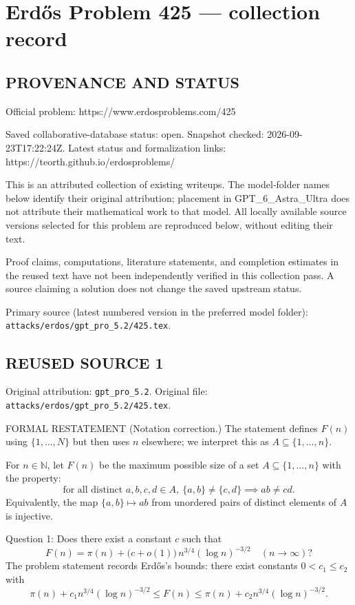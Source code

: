 \section*{Erd\H{o}s Problem 425 --- collection record}

\subsection*{PROVENANCE AND STATUS}
Official problem: https://www.erdosproblems.com/425

Saved collaborative-database status: open.
Snapshot checked: 2026-09-23T17:22:24Z.
Latest status and formalization links: https://teorth.github.io/erdosproblems/

This is an attributed collection of existing writeups. The model-folder names below identify their original attribution; placement in GPT\_6\_Astra\_Ultra does not attribute their mathematical work to that model. All locally available source versions selected for this problem are reproduced below, without editing their text.

Proof claims, computations, literature statements, and completion estimates in the reused text have not been independently verified in this collection pass. A source claiming a solution does not change the saved upstream status.

Primary source (latest numbered version in the preferred model folder): \texttt{attacks/erdos/gpt\_pro\_5.2/425.tex}.

\subsection*{REUSED SOURCE 1}
Original attribution: \texttt{gpt\_pro\_5.2}.
Original file: \texttt{attacks/erdos/gpt\_pro\_5.2/425.tex}.


FORMAL RESTATEMENT
(Notation correction.) The statement defines $F(n)$ using $\{1,\dots,N\}$ but then uses $n$ elsewhere; we interpret this as $A\subseteq\{1,\dots,n\}$.

For $n\in\mathbb N$, let $F(n)$ be the maximum possible size of a set $A\subseteq\{1,\dots,n\}$ with the property:
\[
\text{for all distinct }a,b,c,d\in A,\ \{a,b\}\ne\{c,d\}\implies ab\ne cd.
\]
Equivalently, the map $\{a,b\}\mapsto ab$ from unordered pairs of distinct elements of $A$ is injective.

Question 1: Does there exist a constant $c$ such that
\[
F(n)=\pi(n)+\bigl(c+o(1)\bigr)\,n^{3/4}(\log n)^{-3/2}\quad (n\to\infty)?
\]
The problem statement records Erd\H{o}s’s bounds: there exist constants $0<c_1\le c_2$ with
\[
\pi(n)+c_1 n^{3/4}(\log n)^{-3/2}\le F(n)\le \pi(n)+c_2 n^{3/4}(\log n)^{-3/2}.
\]

